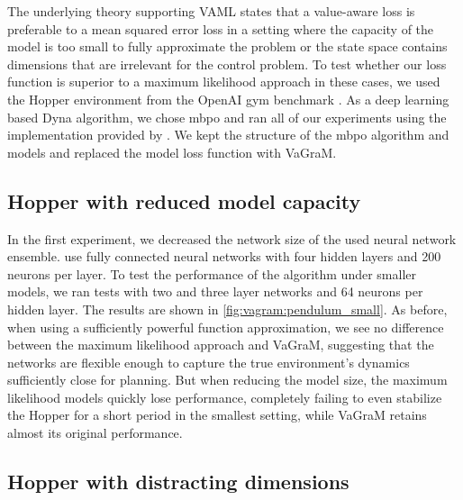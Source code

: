 The underlying theory supporting VAML states that a value-aware loss is preferable to a mean squared error loss in a setting where the capacity of the model is too small to fully approximate the problem or the state space contains dimensions that are irrelevant for the control problem.
To test whether our loss function is superior to a maximum likelihood approach in these cases, we used the Hopper environment from the OpenAI gym benchmark \parencite{brockman2016openai}. 
As a deep learning based Dyna algorithm, we chose \ac{mbpo} \parencite{janner2019mbpo} and ran all of our experiments using the implementation provided by \textcite{pineda2021mbrl}.
We kept the structure of the \ac{mbpo} algorithm and models and replaced the model loss function with VaGraM.

\subsection{Hopper with reduced model capacity}
In the first experiment, we decreased the network size of the used neural network ensemble.
\textcite{janner2019mbpo} use fully connected neural networks with four hidden layers and 200 neurons per layer.
To test the performance of the algorithm under smaller models, we ran tests with two and three layer networks and 64 neurons per hidden layer.
The results are shown in \autoref{fig:vagram:pendulum_small}.
As before, when using a sufficiently powerful function approximation, we see no difference between the maximum likelihood approach and VaGraM, suggesting that the networks are flexible enough to capture the true environment's dynamics sufficiently close for planning.
But when reducing the model size, the maximum likelihood models quickly lose performance, completely failing to even stabilize the Hopper for a short period in the smallest setting, while VaGraM retains almost its original performance.

\subsection{Hopper with distracting dimensions}


